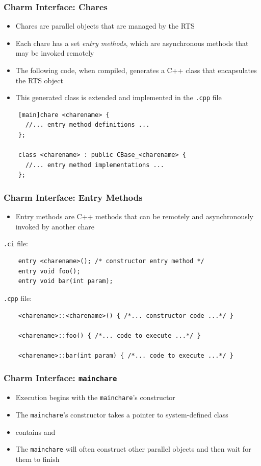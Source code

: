 \begin{frame}[fragile]
  \frametitle{Charm Interface: Chares}
  \begin{itemize}
    \item Chares are parallel objects that are managed by the RTS
    \item Each chare has a set \textit{entry methods}, which are asynchronous
      methods that may be invoked remotely
    \item The following code, when compiled, generates a C++ class
       that encapsulates the RTS object
    \item This generated class is extended and implemented in the \texttt{.cpp}
      file
  \end{itemize}
  \begin{lstlisting}
    [main]chare <charename> {
      //... entry method definitions ...
    };

    class <charename> : public CBase_<charename> {
      //... entry method implementations ...
    };
  \end{lstlisting}
\end{frame}

\begin{frame}[fragile]
  \frametitle{Charm Interface: Entry Methods}
  \begin{itemize}
  \item Entry methods are C++ methods that can be remotely and asynchronously
    invoked by another chare
  \end{itemize}
  \texttt{.ci} file:
  \begin{lstlisting}
    entry <charename>(); /* constructor entry method */
    entry void foo();
    entry void bar(int param);
  \end{lstlisting}
  \texttt{.cpp} file:
  \begin{lstlisting}
    <charename>::<charename>() { /*... constructor code ...*/ }

    <charename>::foo() { /*... code to execute ...*/ }

    <charename>::bar(int param) { /*... code to execute ...*/ }
  \end{lstlisting}
\end{frame}

\begin{frame}[fragile]
   \frametitle{Charm Interface: \texttt{mainchare}}
   \begin{itemize}
     \item Execution begins with the \texttt{mainchare}'s constructor
     \item The \texttt{mainchare}'s constructor takes a pointer to
       system-defined class 
     \item {} contains  and 
     \item The \texttt{mainchare} will often construct other parallel objects
       and then wait for them to finish
   \end{itemize}
\end{frame}

